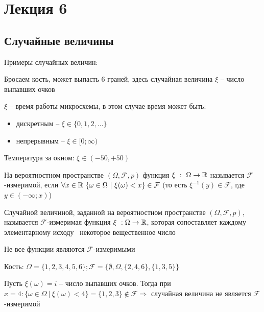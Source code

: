 \documentclass[12pt]{article}
\begin{document}
    \section{Лекция 6}

    \subsection{Случайные величины}

    Примеры случайных величин:

     Бросаем кость, может выпасть 6 граней, здесь случайная величина $\xi$ -- число выпавших очков

     $\xi$ -- время работы микросхемы, в этом случае время может быть:

    \begin{itemize}
        \item дискретным -- $\xi \in \{0, 1, 2, \dots\}$

        \item непрерывным -- $\xi \in [0; \infty)$
    \end{itemize}

     Температура за окном: $\xi \in (-50, +50)$

    \hypertarget{measurabilityoffunction}{}

    \Def На вероятностном пространстве $(\Omega, \mathcal{F}, p)$ функция $\xi \ : \ \Omega \to \mathbb{R}$ называется
    $\mathcal{F}$-измеримой, если $\forall x \in \mathbb{R} \ \{\omega \in \Omega \ | \ \xi(\omega) < x\} \in \mathcal{F}$
    (то есть $\xi^{-1}(y) \in \mathcal{F}$, где $y \in (-\infty; x)$)

    \hypertarget{randomvaluedefinition}{}

    \Def Случайной величиной, заданной на вероятностном пространстве $(\Omega, \mathcal{F}, p)$, называется
    $\mathcal{F}$-измеримая функция $\xi \ : \Omega \to \mathbb{R}$, которая сопоставляет каждому элементарному исходу \
    некоторое вещественное число

    \Nota Не все функции являются $\mathcal{F}$-измеримыми

    \Exs Кость: $\Omega = \{1, 2, 3, 4, 5, 6\}; \mathcal{F} = \{\emptyset, \Omega, \{2, 4, 6\}, \{1, 3, 5\}\}$

    Пусть $\xi(\omega) = i$ -- число выпавших очков. Тогда при $x = 4: \{\omega \in \Omega \ | \ \xi (\omega) < 4\} = \{1, 2, 3\} \notin \mathcal{F} \Longrightarrow$ случайная величина не является $\mathcal{F}$-измеримой
\end{document}
